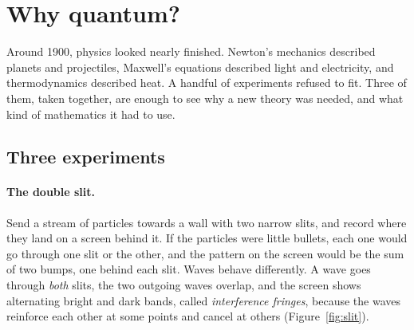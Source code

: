 \section{Why quantum?}\label{sec:motivation}

Around 1900, physics looked nearly finished. Newton's mechanics described planets and projectiles, Maxwell's equations described light and electricity, and thermodynamics described heat. A handful of experiments refused to fit.
Three of them, taken together, are enough to see why a new theory was needed, and what kind of mathematics it had to use.

\subsection{Three experiments}

\paragraph{The double slit.}
Send a stream of particles towards a wall with two narrow slits, and record where they land on a screen behind it. If the particles were little bullets, each one would go through one slit or the other, and the pattern on the screen would be the sum of two bumps, one behind each slit. Waves behave differently.
A wave goes through \emph{both} slits, the two outgoing waves overlap, and the screen shows alternating bright and dark bands, called \emph{interference fringes}, because the waves reinforce each other at some points and cancel at others (Figure~\ref{fig:slit}).

